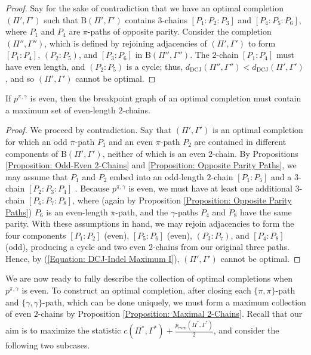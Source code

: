 \begin{proof}
Say for the sake of contradiction that we have an optimal completion $(\Pi', \Gamma')$ such that $\mathrm{B}(\Pi', \Gamma')$ contains $3$-chains $[P_1:P_2:P_3]$ and $[P_4:P_5:P_6]$, where $P_1$ and $P_4$ are $\pi$-paths of opposite parity.  Consider the completion $(\Pi'', \Gamma'')$, which is defined by rejoining adjacencies of $(\Pi', \Gamma')$ to form $[P_1:P_4]$, $(P_2:P_5)$, and $[P_3:P_6]$ in $\mathrm{B}(\Pi'', \Gamma'')$. The $2$-chain $[P_1:P_4]$ must have even length, and $(P_2:P_5)$ is a cycle; thus, $d_{\mathrm{DCJ}}(\Pi'', \Gamma'') < d_{\mathrm{DCJ}}(\Pi', \Gamma')$, and so $(\Pi', \Gamma')$ cannot be optimal. 
\end{proof}

\begin{proposition}
If $p^{\pi, \gamma}$ is even, then the breakpoint graph of an optimal completion must contain a maximum set of even-length $2$-chains.
\label{Proposition: Maximal 2-Chains}
\end{proposition}

\begin{proof}
We proceed by contradiction.  Say that $(\Pi', \Gamma')$ is an optimal completion for which an odd $\pi$-path $P_1$ and an even $\pi$-path $P_2$ are contained in different components of $\mathrm{B}(\Pi', \Gamma')$, neither of which is an even $2$-chain.  By Propositions \ref{Proposition: Odd-Even 2-Chains} and  \ref{Proposition: Opposite Parity Paths}, we may assume that  $P_1$ and $P_2$ embed into an odd-length $2$-chain $[P_1:P_5]$ and a $3$-chain $[P_2:P_3:P_4]$ . Because $p^{\pi, \gamma}$ is even,  we must have at least one additional $3$-chain $[P_6:P_7:P_8]$, where (again by Proposition \ref{Proposition: Opposite Parity Paths}) $P_6$ is an even-length $\pi$-path, and the $\gamma$-paths $P_4$ and $P_8$ have the same parity.  With these assumptions in hand, we may rejoin adjacencies to form the four components $[P_1:P_2]$ (even), $[P_5:P_6]$ (even), $(P_3:P_7)$, and $[P_4:P_8]$ (odd), producing a cycle and two even $2$-chains from our original three paths.  Hence, by (\ref{Equation: DCJ-Indel Maximum I}), $(\Pi', \Gamma')$ cannot be optimal. 
\end{proof}

We are now ready to fully describe the collection of optimal completions when $p^{\pi, \gamma}$ is even.  To construct an optimal completion, after closing each $\{\pi, \pi\}$-path and $\{\gamma, \gamma\}$-path, which can be done uniquely, we must form a maximum collection of even $2$-chains by Proposition \ref{Proposition: Maximal 2-Chains}.  Recall that our aim is to maximize the statistic $c(\Pi^*, \Gamma^*) + \frac{p_{\mathrm{even}}(\Pi^*, \Gamma^*)}{2}$, and consider the following two subcases.

